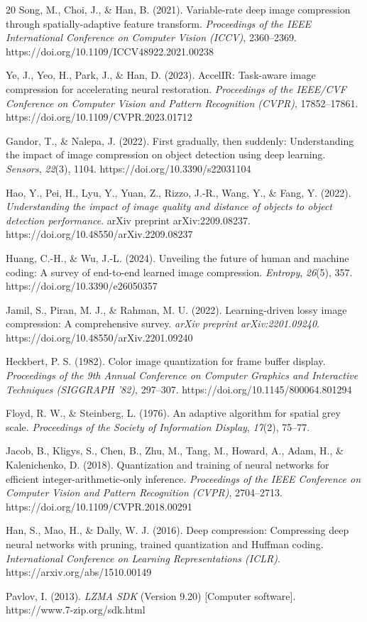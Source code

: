 \documentclass[12pt, a4paper]{article}
\begin{document}
\begin{thebibliography}{20}
Song, M., Choi, J., \& Han, B. (2021). Variable-rate deep image compression through spatially-adaptive feature transform. \textit{Proceedings of the IEEE International Conference on Computer Vision (ICCV)}, 2360–2369. https://doi.org/10.1109/ICCV48922.2021.00238

Ye, J., Yeo, H., Park, J., \& Han, D. (2023). AccelIR: Task-aware image compression for accelerating neural restoration. \textit{Proceedings of the IEEE/CVF Conference on Computer Vision and Pattern Recognition (CVPR)}, 17852–17861. https://doi.org/10.1109/CVPR.2023.01712

Gandor, T., \& Nalepa, J. (2022). First gradually, then suddenly: Understanding the impact of image compression on object detection using deep learning. \textit{Sensors}, \textit{22}(3), 1104. https://doi.org/10.3390/s22031104

Hao, Y., Pei, H., Lyu, Y., Yuan, Z., Rizzo, J.-R., Wang, Y., \& Fang, Y. (2022). \textit{Understanding the impact of image quality and distance of objects to object detection performance}. arXiv preprint arXiv:2209.08237. https://doi.org/10.48550/arXiv.2209.08237

Huang, C.-H., \& Wu, J.-L. (2024). Unveiling the future of human and machine coding: A survey of end-to-end learned image compression. \textit{Entropy}, \textit{26}(5), 357. https://doi.org/10.3390/e26050357

Jamil, S., Piran, M. J., \& Rahman, M. U. (2022). Learning-driven lossy image compression: A comprehensive survey. \textit{arXiv preprint arXiv:2201.09240}. https://doi.org/10.48550/arXiv.2201.09240

Heckbert, P. S. (1982). Color image quantization for frame buffer display. \textit{Proceedings of the 9th Annual Conference on Computer Graphics and Interactive Techniques (SIGGRAPH ’82)}, 297–307. https://doi.org/10.1145/800064.801294

Floyd, R. W., \& Steinberg, L. (1976). An adaptive algorithm for spatial grey scale. \textit{Proceedings of the Society of Information Display}, \textit{17}(2), 75–77.

Jacob, B., Kligys, S., Chen, B., Zhu, M., Tang, M., Howard, A., Adam, H., \& Kalenichenko, D. (2018). Quantization and training of neural networks for efficient integer-arithmetic-only inference. \textit{Proceedings of the IEEE Conference on Computer Vision and Pattern Recognition (CVPR)}, 2704–2713. https://doi.org/10.1109/CVPR.2018.00291

Han, S., Mao, H., \& Dally, W. J. (2016). Deep compression: Compressing deep neural networks with pruning, trained quantization and Huffman coding. \textit{International Conference on Learning Representations (ICLR)}. https://arxiv.org/abs/1510.00149

Pavlov, I. (2013). \textit{LZMA SDK} (Version 9.20) [Computer software]. https://www.7-zip.org/sdk.html

\end{thebibliography}
\end{document}
